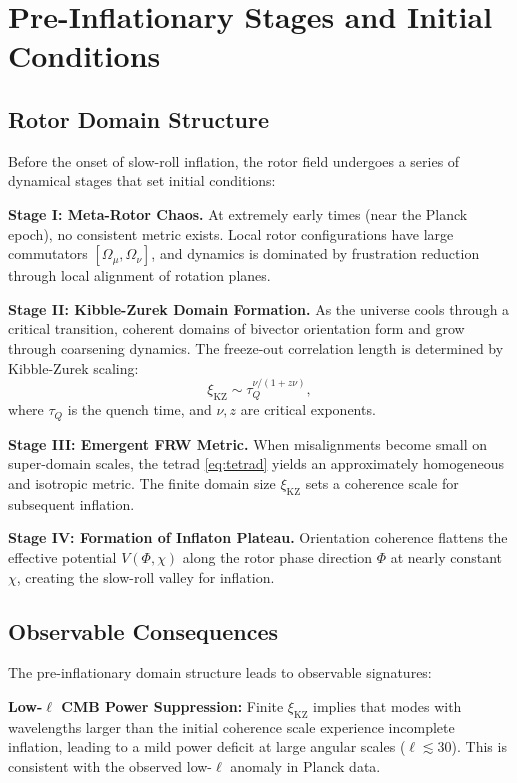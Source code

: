\documentclass[11pt,a4paper]{article}
\numberwithin{equation}{section}
\theoremstyle{plain}
\theoremstyle{definition}
\theoremstyle{remark}
\begin{document}
\section{Pre-Inflationary Stages and Initial Conditions}
\label{sec:preinflation}

\subsection{Rotor Domain Structure}

Before the onset of slow-roll inflation, the rotor field undergoes a series of dynamical stages that set initial conditions:

\textbf{Stage I: Meta-Rotor Chaos.} At extremely early times (near the Planck epoch), no consistent metric exists. Local rotor configurations have large commutators $[\Omega_\mu, \Omega_\nu]$, and dynamics is dominated by frustration reduction through local alignment of rotation planes.

\textbf{Stage II: Kibble-Zurek Domain Formation.} As the universe cools through a critical transition, coherent domains of bivector orientation form and grow through coarsening dynamics. The freeze-out correlation length is determined by Kibble-Zurek scaling:
\begin{equation}
\xi_{\mathrm{KZ}} \sim \tau_Q^{\nu/(1+z\nu)},
\label{eq:kibble-zurek}
\end{equation}
where $\tau_Q$ is the quench time, and $\nu, z$ are critical exponents.

\textbf{Stage III: Emergent FRW Metric.} When misalignments become small on super-domain scales, the tetrad \eqref{eq:tetrad} yields an approximately homogeneous and isotropic metric. The finite domain size $\xi_{\mathrm{KZ}}$ sets a coherence scale for subsequent inflation.

\textbf{Stage IV: Formation of Inflaton Plateau.} Orientation coherence flattens the effective potential $V(\Phi,\chi)$ along the rotor phase direction $\Phi$ at nearly constant $\chi$, creating the slow-roll valley for inflation.

\subsection{Observable Consequences}

The pre-inflationary domain structure leads to observable signatures:

\textbf{Low-$\ell$ CMB Power Suppression:} Finite $\xi_{\mathrm{KZ}}$ implies that modes with wavelengths larger than the initial coherence scale experience incomplete inflation, leading to a mild power deficit at large angular scales ($\ell \lesssim 30$). This is consistent with the observed low-$\ell$ anomaly in Planck data.
\end{document}
